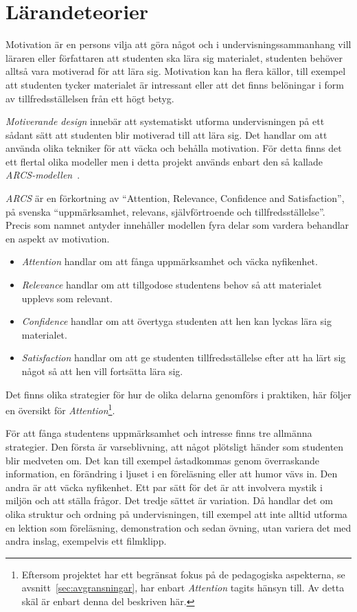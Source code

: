 \section{Lärandeteorier}\label{sec:arcs}

Motivation är en persons vilja att göra något och i undervisningssammanhang vill
läraren eller författaren att studenten ska lära sig materialet, studenten behöver alltså vara
motiverad för att lära sig. Motivation kan ha flera källor, till exempel
att studenten tycker materialet är intressant eller att det finns belöningar i
form av tillfredsställelsen från ett högt betyg.

\textit{Motiverande design} innebär att systematiskt utforma undervisningen på
ett sådant sätt att studenten blir motiverad till att lära sig. Det handlar om
att använda olika tekniker för att väcka och behålla motivation. För detta finns
det ett flertal olika modeller men i detta projekt används enbart den så
kallade \textit{ARCS-modellen}~\cite{arcs_book}.

\textit{ARCS} är en förkortning av ``Attention, Relevance, Confidence and
Satisfaction'', på svenska ``uppmärksamhet, relevans, självförtroende och
tillfredsställelse''. Precis som namnet antyder innehåller modellen fyra delar
som vardera behandlar en aspekt av motivation.
\begin{itemize}
  \item \textit{Attention} handlar om att fånga uppmärksamhet och väcka
    nyfikenhet.
  \item \textit{Relevance} handlar om att tillgodose studentens behov så
    att materialet upplevs som relevant.
  \item \textit{Confidence} handlar om att övertyga studenten att hen kan lyckas
    lära sig materialet.
  \item \textit{Satisfaction} handlar om att ge studenten
    tillfredsställelse efter att ha lärt sig något så att hen vill fortsätta
    lära sig.
\end{itemize}
Det finns olika strategier för hur de olika delarna genomförs i praktiken,
här följer en översikt för \textit{Attention}\footnote{Eftersom projektet har
ett begränsat fokus på de pedagogiska aspekterna, se
avsnitt~\ref{sec:avgransningar}, har enbart \textit{Attention} tagits hänsyn
till. Av detta skäl är enbart denna del beskriven här.}.

För att fånga studentens uppmärksamhet och intresse finns tre allmänna
strategier. Den första är varseblivning, att något plötsligt händer som studenten
blir medveten om. Det kan till exempel åstadkommas genom överraskande
information, en förändring i ljuset i en föreläsning eller att humor vävs in.
Den andra är att väcka nyfikenhet. Ett par sätt för det är att involvera mystik
i miljön och att ställa frågor. Det tredje sättet är variation. Då handlar det
om olika struktur och ordning på undervisningen, till exempel att inte alltid
utforma en lektion som föreläsning, demonstration och sedan övning, utan variera
det med andra inslag, exempelvis ett filmklipp.

